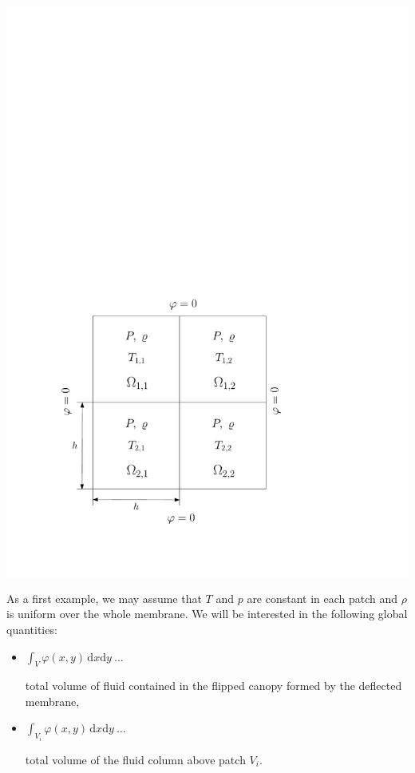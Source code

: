 \documentclass{article}
\newcommand{\dxy}{\ensuremath{\,\mathrm{d}x\mathrm{d}y}}
\begin{document}
\begin{center}
	\includegraphics[scale=0.6]{geometry}
	\label{fig:geometry}
\end{center}
As a first example, we may assume that $T$ and $p$ are constant in each patch and $\rho$ is uniform over the whole membrane. We will be interested in the following global quantities:
\begin{itemize}
	\item $\displaystyle\int_V\varphi(x,y)\dxy\ \ldots$ \parbox[t]{7.5cm}{total volume of fluid contained in the flipped canopy formed by the deflected membrane,}
	\item $\displaystyle\int_{V_i}\varphi(x,y)\dxy\ \ldots$ \parbox[t]{7.5cm}{total volume of the fluid column above patch $V_i$.}
\end{itemize}
\end{document}
